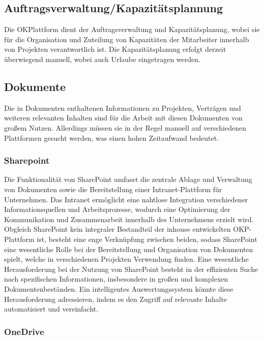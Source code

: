 \subsection{Auftragsverwaltung/Kapazitätsplannung}

Die OKPlattform dient der Auftragsverwaltung und Kapazitätsplanung, wobei sie für die Organisation und Zuteilung von Kapazitäten der Mitarbeiter innerhalb von Projekten verantwortlich ist. Die Kapazitätsplanung erfolgt derzeit überwiegend manuell, wobei auch Urlaube eingetragen werden.

\subsection{Dokumente}

Die in Dokumenten enthaltenen Informationen zu Projekten, Verträgen und weiteren relevanten Inhalten sind für die Arbeit mit diesen Dokumenten von großem Nutzen. Allerdings müssen sie in der Regel manuell auf verschiedenen Plattformen gesucht werden, was einen hohen Zeitaufwand bedeutet.

\subsubsection{Sharepoint}

Die Funktionalität von SharePoint umfasst die zentrale Ablage und Verwaltung von Dokumenten sowie die Bereitstellung einer Intranet-Plattform für Unternehmen. Das Intranet ermöglicht eine nahtlose Integration verschiedener Informationsquellen und Arbeitsprozesse, wodurch eine Optimierung der Kommunikation und Zusammenarbeit innerhalb des Unternehmens erzielt wird. Obgleich SharePoint kein integraler Bestandteil der inhouse entwickelten OKP-Plattform ist, besteht eine enge Verknüpfung zwischen beiden, sodass SharePoint eine wesentliche Rolle bei der Bereitstellung und Organisation von Dokumenten spielt, welche in verschiedenen Projekten Verwendung finden. Eine wesentliche Herausforderung bei der Nutzung von SharePoint besteht in der effizienten Suche nach spezifischen Informationen, insbesondere in großen und komplexen Dokumentenbeständen. Ein intelligentes Auswertungssystem könnte diese Herausforderung adressieren, indem es den Zugriff auf relevante Inhalte automatisiert und vereinfacht.

\subsubsection{OneDrive}

